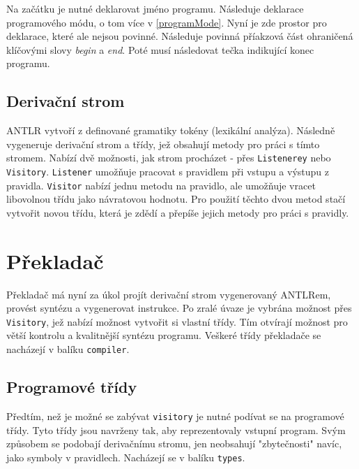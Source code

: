 \documentclass[
12pt,
a4paper,
pdftex,
czech,
titlepage
]{report}
\begin{document}
Na začátku je nutné deklarovat jméno programu. Následuje deklarace programového módu, o tom více v \ref{programMode}. Nyní je zde prostor pro deklarace, které ale nejsou povinné. Následuje povinná příakzová část ohraničená klíčovými slovy \textit{begin} a \textit{end}. Poté musí následovat tečka indikující konec programu.
	
 \subsection{Derivační strom}
 
 ANTLR vytvoří z definované gramatiky tokény (lexikální analýza). Následně vygeneruje derivační strom a třídy, jež obsahují metody pro práci s tímto stromem. Nabízí dvě možnosti, jak strom procházet - přes \texttt{Listenerey} nebo \texttt{Visitory}. \texttt{Listener} umožňuje pracovat s pravidlem při vstupu a výstupu z pravidla. \texttt{Visitor} nabízí jednu metodu na pravidlo, ale umožňuje vracet libovolnou třídu jako návratovou hodnotu. Pro použití těchto dvou metod stačí vytvořit novou třídu, která je zdědí a přepíše jejich metody pro práci s pravidly.
 
 \section{Překladač}
 
 Překladač má nyní za úkol projít derivační strom vygenerovaný ANTLRem, provést syntézu a vygenerovat instrukce. Po zralé úvaze je vybrána možnost přes \texttt{Visitory}, jež nabízí možnost vytvořit si vlastní třídy. Tím otvírají možnost pro větší kontrolu a kvalitnější syntézu programu. Veškeré třídy překladače se nacházejí v balíku \texttt{compiler}.
 
 \subsection{Programové třídy}
 Předtím, než je možné se zabývat \texttt{visitory} je nutné podívat se na programové třídy. Tyto třídy jsou navrženy tak, aby reprezentovaly vstupní program. Svým způsobem se podobají derivačnímu stromu, jen neobsahují "zbytečnosti" navíc, jako symboly v pravidlech. Nacházejí se v balíku \texttt{types}. 
 
\end{document}
